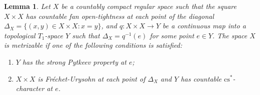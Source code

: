 \documentclass{amsart}
\newtheorem{lemma}[theorem]{Lemma}
\theoremstyle{definition}
\begin{document}
\begin{lemma}\label{comp1} Let $X$ be a countably compact regular space such that the square $X\times X$ has countable fan open-tightness at each point of the diagonal $\Delta_X=\{(x,y)\in X\times X:x=y\}$, and $q:X\times X\to Y$ be a continuous map into a topological $T_1$-space $Y$ such that $\Delta_X=q^{-1}(e)$ for some point $e\in Y$. The space $X$ is metrizable if one of the following conditions is satisfied:
\begin{enumerate}
\item $Y$ has the strong Pytkeev property at $e$;
\item $X\times X$ is Fr\'echet-Urysohn at each point of $\Delta_X$ and $Y$ has countable ${\mathrm{cs}}^*$-character at $e$.
\end{enumerate}
\end{lemma}
\end{document}
